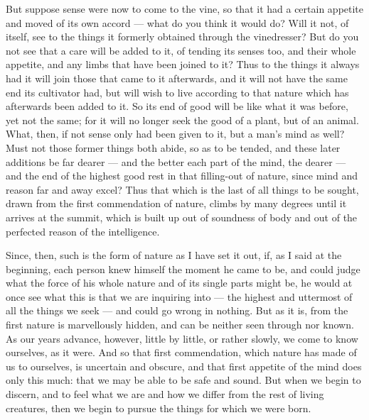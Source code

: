  But suppose sense were now to come to the vine, so that it had a certain appetite and moved of its own accord — what do you think it would do? Will it not, of itself, see to the things it formerly obtained through the vinedresser? But do you not see that a care will be added to it, of tending its senses too, and their whole appetite, and any limbs that have been joined to it? Thus to the things it always had it will join those that came to it afterwards, and it will not have the same end its cultivator had, but will wish to live according to that nature which has afterwards been added to it. So its end of good will be like what it was before, yet not the same; for it will no longer seek the good of a plant, but of an animal. What, then, if not sense only had been given to it, but a man's mind as well? Must not those former things both abide, so as to be tended, and these later additions be far dearer — and the better each part of the mind, the dearer — and the end of the highest good rest in that filling-out of nature, since mind and reason far and away excel? Thus that which is the last of all things to be sought, drawn from the first commendation of nature, climbs by many degrees until it arrives at the summit, which is built up out of soundness of body and out of the perfected reason of the intelligence.

 Since, then, such is the form of nature as I have set it out, if, as I said at the beginning, each person knew himself the moment he came to be, and could judge what the force of his whole nature and of its single parts might be, he would at once see what this is that we are inquiring into — the highest and uttermost of all the things we seek — and could go wrong in nothing. But as it is, from the first nature is marvellously hidden, and can be neither seen through nor known. As our years advance, however, little by little, or rather slowly, we come to know ourselves, as it were. And so that first commendation, which nature has made of us to ourselves, is uncertain and obscure, and that first appetite of the mind does only this much: that we may be able to be safe and sound. But when we begin to discern, and to feel what we are and how we differ from the rest of living creatures, then we begin to pursue the things for which we were born.

